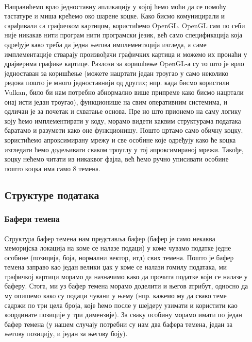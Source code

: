 \documentclass[12pt]{article}
\begin{document}
	\paragraph{}
	Направићемо врло једноставну апликацију у којој ћемо моћи да се помоћу тастатуре и миша крећемо око шарене коцке. Како бисмо комуницирали и сарађивали са графичком картицом, користићемо OpenGL. OpenGL сам по себи није никакав нити програм нити програмски језик, већ само спецификација која одређује како треба да једна његова имплементација изгледа, а саме имплементације стварају произвођачи графичких картица и можемо их пронаћи у драјверима графике картице. Разлози за коришћење OpenGL-а су то што је врло једноставан за коришћење (можете нацртати један троугао у само неколико редова пошто је много једноставнији од других; нпр. када бисмо користили  Vulkan, било би нам потребно абнормално више припреме како бисмо нацртали онај исти један троугао), функционише на свим оперативним системима, и одличан је за почетак и схватање основа. Пре но што  прионемо на саму логику коју ћемо имплементирати у коду, морамо видети каквим структурама података баратамо и разумети како оне функционишу. Пошто цртамо само обичну коцку, користићемо апроксимирану мрежу и све особине које одређују како ће коцка изгледати ћемо додељивати сваком троуглу у тој апроксимираној мрежи. Такође, коцку нећемо читати из никаквог фајла, већ ћемо ручно уписивати особине пошто коцка има само 8 темена.
	
	\subsection{Структуре података}
	
	\subsubsection{Бафери темена}
	\paragraph{}
	Структура бафер темена нам представља бафер (бафер је само некаква меморијска локација на коме се налазе подаци) у коме чувамо податке једне особине (позиција, боја, нормални вектор, итд) свих темена. Пошто је бафер темена заправо као један велики џак у коме се налази гомилу података, ми графичкој картици морамо да назначимо како да прочита податке који се налазе у баферу. Стога, ми уз бафер темена морамо доделити и његов атрибут, односно да му опишемо како су подаци чувани у њему (нпр. кажемо му да свако теме садржи по три цела броја, које ћемо после у шејдеру узимати и користити као координате позиције у три димензије). За сваку особину морамо имати по један бафер темена (у нашем случају потребни су нам два бафера темена, један за његову позицију, и један за његову боју).
	
\end{document}
